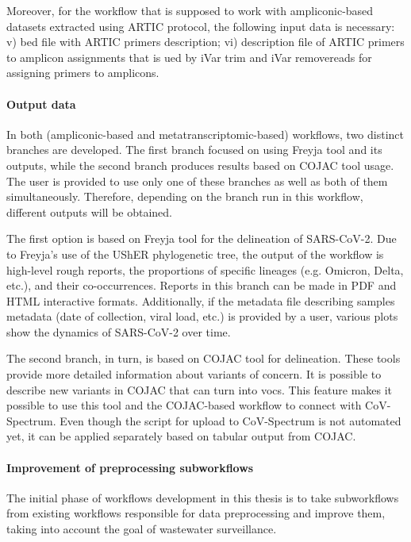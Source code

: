             Moreover, for the workflow that is supposed to work with ampliconic-based datasets extracted using ARTIC protocol, the following input data is necessary: v) \acrshort{bed} file with ARTIC primers description; vi) description file of ARTIC primers to amplicon assignments that is ued by iVar trim and iVar removereads for assigning primers to amplicons. 

            \paragraph{Output data} \label{sec:methods:changes:output}
            In both (ampliconic-based and metatranscriptomic-based) workflows, two distinct branches are developed. The first branch focused on using Freyja tool and its outputs, while the second branch produces results based on COJAC tool usage. The user is provided to use only one of these branches as well as both of them simultaneously. Therefore, depending on the branch run in this workflow, different outputs will be obtained.
            
            The first option is based on Freyja tool for the delineation of SARS-CoV-2. Due to Freyja's use of the UShER phylogenetic tree, the output of the workflow is high-level rough reports, the proportions of specific lineages (e.g. Omicron, Delta, etc.), and their co-occurrences. Reports in this branch can be made in PDF and HTML interactive formats. Additionally, if the metadata file describing samples metadata (date of collection, viral load, etc.) is provided by a user, various plots show the dynamics of SARS-CoV-2 over time.
            
            The second branch, in turn, is based on COJAC tool for delineation. These tools provide more detailed information about variants of concern. It is possible to describe new variants in COJAC that can turn into \acrshort{vocs}. This feature makes it possible to use this tool and the COJAC-based workflow to connect with CoV-Spectrum. Even though the script for upload to CoV-Spectrum is not automated yet, it can be applied separately based on tabular output from COJAC. 

            \paragraph{Improvement of preprocessing subworkflows} \label{sec:methods:changes:improvement}
            The initial phase of workflows development in this thesis is to take subworkflows from existing workflows responsible for data preprocessing and improve them, taking into account the goal of wastewater surveillance. 

